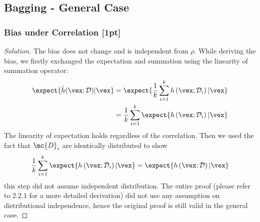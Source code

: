 \documentclass{article}
\begin{document}
	\subsection{Bagging - General Case}
	\subsubsection{Bias under Correlation [1pt]}
	\begin{proof}[Solution]
		The bias does not change and is independent from $\rho$. While deriving the bias, we firstly exchanged the expectation and summation using the linearity of summation operator:
		\begin{align}
			\expect{
				\bar{h}(\vex ; \mathcal{D})|\vex}
			&= \expect{
			\frac{1}{k} \sum_{i=1}^{k}
			h\left(\vex ; \mathcal{D}_{i}\right)
			| \vex} \\
			&= \frac{1}{k}
			\sum_{i=1}^{k}
			\expect{
			h\left(\vex ; \mathcal{D}_{i}\right)
			| \vex}
		\end{align}
		The linearity of expectation holds regardless of the correlation. Then we used the fact that $\mc{D}_i$ are identically distributed to show
		\begin{align}
			\frac{1}{k}
			\sum_{i=1}^{k}
			\expect{
			h\left(\vex ; \mathcal{D}_{i}\right)
			| \vex}
			= \expect{
			h\left(\vex ; \mathcal{D}\right)
			| \vex}
		\end{align}
		this step did not assume independent distribution. The entire proof (please refer to 2.2.1 for a more detailed derivation) did not use any assumption on distributional independence, hence the original proof is still valid in the general case.
	\end{proof}
	
\end{document}
